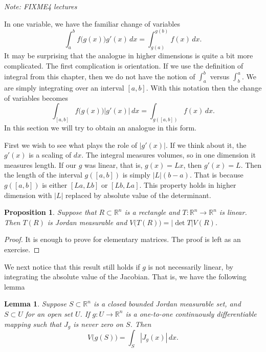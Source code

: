 \documentclass[12pt]{book}
\newcommand{\abs}[1]{\left\lvert {#1} \right\rvert}
\newcommand{\R}{{\mathbb{R}}}
\newcommand{\sectionnotes}[1]{\noindent \emph{Note: #1} \medskip \par}
\theoremstyle{plain}
\newtheorem{lemma}[thm]{Lemma}
\newtheorem{prop}[thm]{Proposition}
\theoremstyle{remark}
\theoremstyle{definition}
\theoremstyle{exercise}
\theoremstyle{example}
\begin{document}
\sectionnotes{FIXME4 lectures}

In one variable, we have the familiar change of variables
\begin{equation*}
\int_a^b f\bigl(g(x)\bigr) g'(x)\, dx = 
\int_{g(a)}^{g(b)} f(x) \, dx .
\end{equation*}
It may be surprising that the analogue in higher dimensions is quite
a bit more complicated.  The first complication is orientation.  If we use
the definition of integral from this chapter, then we do not have the notion
of $\int_a^b$ versus $\int_b^a$.  We are simply integrating over an
interval $[a,b]$.  With this notation then the change of variables becomes
\begin{equation*}
\int_{[a,b]} f\bigl(g(x)\bigr) \abs{g'(x)}\, dx = 
\int_{g([a,b])} f(x) \, dx .
\end{equation*}
In this section we will try to obtain an analogue in this form.

First we wish to see what plays the role of $\abs{g'(x)}$.  If we think about it,
the $g'(x)$ is a scaling of $dx$.  The integral measures volumes, so in one
dimension it measures length.  If our $g$ was linear, that is, $g(x)=Lx$, then
$g'(x) = L$.  Then the length of the interval $g([a,b])$ is simply
$\abs{L}(b-a)$.  That is because $g([a,b])$ is either $[La,Lb]$ or
$[Lb,La]$.  This property holds in higher dimension with $\abs{L}$ replaced
by absolute value of the determinant.

\begin{prop} \label{prop:volrectdet}
Suppose that $R \subset \R^n$ is a rectangle
and $T \colon \R^n \to \R^n$ is linear.  Then
$T(R)$ is Jordan measurable and $V\bigl(T(R)\bigr) = \abs{\det T} V(R)$.
\end{prop}

\begin{proof}
It is enough to prove for elementary matrices.  The proof is left as an
exercise.
\end{proof}

We next notice that this result still holds if $g$ is not necessarily
linear, by integrating the absolute value of the Jacobian.  That is, we have
the following lemma

\begin{lemma}
Suppose $S \subset \R^n$ is a closed bounded Jordan measurable set,
and $S \subset U$ for an open set $U$.  If
$g \colon U \to \R^n$ is a one-to-one
continuously differentiable mapping such that
$J_g$ is never zero on $S$.
Then
\begin{equation*}
V\bigl(g(S)\bigr)
=
\int_S \abs{J_g(x)} \, dx .
\end{equation*}
\end{lemma}
\end{document}
